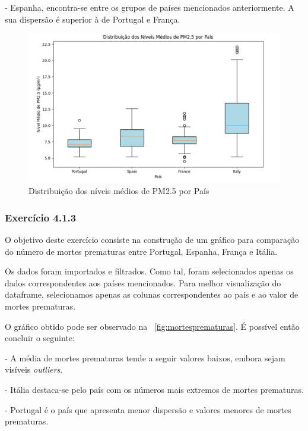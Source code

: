 \documentclass[conference]{IEEEtran}
\begin{document}
- Espanha, encontra-se entre os grupos de países mencionados anteriormente. A sua dispersão é superior à de Portugal e França.

\begin{figure}
	\centering
	\includegraphics[width=0.9\linewidth]{Niveis_medios_pm25}
	\caption{Distribuição dos níveis médios de PM2.5 por País}
	\label{fig:niveismediospm25}
\end{figure}

\medskip
\subsubsection{\textbf{Exercício 4.1.3}}

O objetivo deste exercício consiste na construção de um gráfico para comparação do número de mortes prematuras entre Portugal, Espanha, França e Itália. 

Os dados foram importados e filtrados. Como tal, foram selecionados apenas os dados correspondentes aos países mencionados. Para melhor visualização do dataframe, selecionamos apenas as colunas correspondentes ao país e ao valor de mortes prematuras. 

O gráfico obtido pode ser observado na \figurename~\ref{fig:mortesprematuras}. É possível então concluir o seguinte:

- A média de mortes prematuras tende a seguir valores baixos, embora sejam visíveis \textit{outliers}.

- Itália destaca-se pelo país com os números mais extremos de mortes prematuras.

- Portugal é o país que apresenta menor dispersão e valores menores de mortes prematuras.
\end{document}
